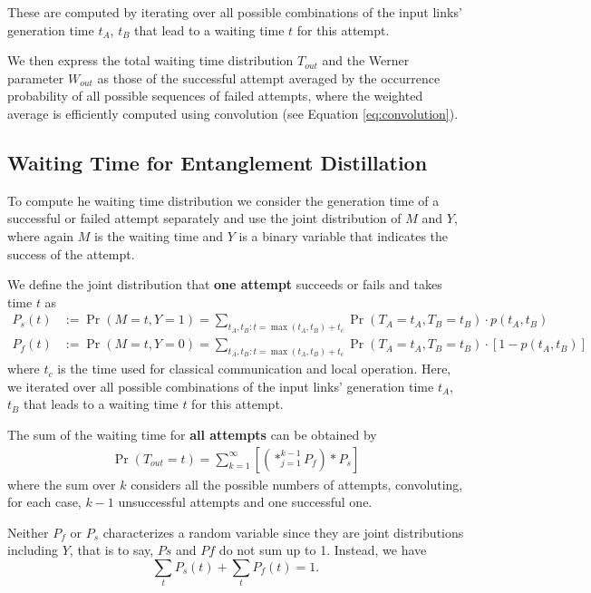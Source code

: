 \documentclass{masterthesis}
\begin{document}
These are computed by iterating over all possible combinations of the input links' generation time $t_A$, $t_B$ that lead to a waiting time $t$ for this attempt.

We then express the total waiting time distribution $T_{out}$ and the Werner parameter $W_{out}$ as those of the successful attempt averaged by the occurrence probability of all possible sequences of failed attempts, where the weighted average is efficiently computed using convolution (see Equation \ref{eq:convolution}). %

\subsection*{Waiting Time for Entanglement Distillation}

To compute he waiting time distribution we consider the generation time of a successful or failed attempt separately and use the joint distribution of $M$ and $Y$, where again $M$ is the waiting time and $Y$ is a binary variable that indicates the success of the attempt. %

We define the joint distribution that \textbf{one attempt} succeeds or fails and takes time $t$ as %
\begin{align}\label{eq:waiting_time_success_failure}
    P_s(t) &:= \Pr(M = t, Y = 1) = \sum_{t_A, t_B : t = \max(t_A, t_B) + t_c} \Pr(T_A = t_A, T_B = t_B) \cdot p(t_A, t_B) \\
    P_f(t) &:= \Pr(M = t, Y = 0) = \sum_{t_A, t_B : t = \max(t_A, t_B) + t_c} \Pr(T_A = t_A, T_B = t_B) \cdot [1 - p(t_A, t_B)]
\end{align}
where $t_c$ is the time used for classical communication and local operation. Here, we iterated over all possible combinations of the input links' generation time $t_A$, $t_B$ that leads to a waiting time $t$ for this attempt.

The sum of the waiting time for \textbf{all attempts} can be obtained by
\begin{align}\label{eq:waiting_time_distillation}
    \Pr(T_{out} = t) = \sum_{k=1}^{\infty} \left[ \left( \ast_{j=1}^{k-1} P_f \right) \ast P_s \right]
\end{align}
where the sum over $k$ considers all the possible numbers of attempts, convoluting, for each case, $k-1$ unsuccessful attempts and one successful one.

Neither $P_f$ or $P_s$ characterizes a random variable since they are joint distributions including $Y$, that is to say, $Ps$ and $Pf$ do not sum up to 1. Instead, we have
\begin{equation}
    \sum_t P_s(t) + \sum_t P_f(t) = 1 .
\end{equation}
\end{document}
